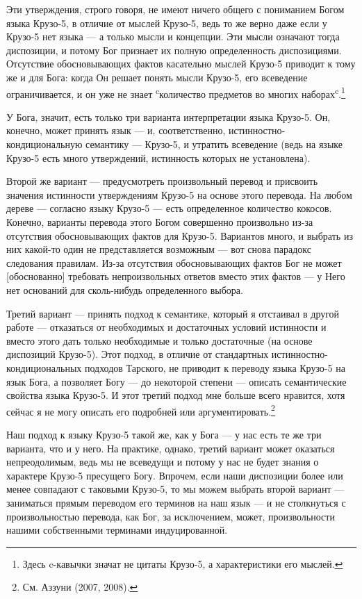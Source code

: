 \documentclass[11pt]{book}
\begin{document}
Эти утверждения, строго говоря, не имеют ничего общего с пониманием Богом языка Крузо-5, в отличие от мыслей Крузо-5, ведь то же верно даже если у Крузо-5 нет языка --- а только мысли и концепции. Эти мысли означают тогда диспозиции, и потому Бог признает их полную определенность диспозициями. Отсутствие обосновывающих фактов касательно мыслей Крузо-5 приводит к тому же и для Бога: когда Он решает понять мысли Крузо-5, его всеведение ограничивается, и он уже не знает \textsuperscript{c}количество предметов во многих наборах\textsuperscript{c}.\footnote{Здесь c-кавычки значат не цитаты Крузо-5, а характеристики его мыслей.}

У Бога, значит, есть только три варианта интерпретации языка Крузо-5. Он, конечно, может принять язык --- и, соответственно, истинностно-кондициональную семантику --- Крузо-5, и утратить всеведение (ведь на языке Крузо-5 есть много утверждений, истинность которых не установлена).

Второй же вариант --- предусмотреть произвольный перевод и присвоить значения истинности утверждениям Крузо-5 на основе этого перевода. На любом дереве --- согласно языку Крузо-5 --- есть определенное количество кокосов. Конечно, варианты перевода этого Богом совершенно произвольно из-за отсутствия обосновывающих фактов для Крузо-5. Вариантов много, и выбрать из них какой-то один не представляется возможным --- вот снова парадокс следования правилам. Из-за отсутствия обосновывающих фактов Бог не может [обоснованно] требовать непроизвольных ответов вместо этих фактов --- у Него нет оснований для сколь-нибудь определенного выбора.

Третий вариант --- принять подход к семантике, который я отстаивал в другой работе --- отказаться от необходимых и достаточных условий истинности и вместо этого дать только необходимые и только достаточные (на основе диспозиций Крузо-5). Этот подход, в отличие от стандартных истинностно-кондициональных подходов Тарского, не приводит к переводу языка Крузо-5 на язык Бога, а позволяет Богу --- до некоторой степени --- описать семантические свойства языка Крузо-5. И этот третий подход мне больше всего нравится, хотя сейчас я не могу описать его подробней или аргументировать.\footnote{См. Аззуни (2007, 2008).}

Наш подход к языку Крузо-5 такой же, как у Бога --- у нас есть те же три варианта, что и у него. На практике, однако, третий вариант может оказаться непреодолимым, ведь мы не всеведущи и потому у нас не будет знания о характере Крузо-5 пресущего Богу. Впрочем, если наши диспозиции более или менее совпадают с таковыми Крузо-5, то мы можем выбрать второй вариант --- заниматься прямым переводом его терминов на наш язык --- и не столкнуться с произвольностью перевода, как Бог, за исключением, может, произвольности нашими собственными терминами индуцированной.
\end{document}
